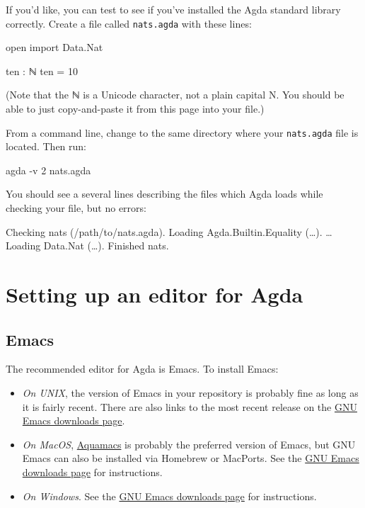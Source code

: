 If you'd like, you can test to see if you've installed the Agda standard
library correctly. Create a file called \texttt{nats.agda} with these
lines:

\begin{myDisplay}
open import Data.Nat

ten : ℕ
ten = 10
\end{myDisplay}

(Note that the ℕ is a Unicode character, not a plain capital N. You
should be able to just copy-and-paste it from this page into your file.)

From a command line, change to the same directory where your
\texttt{nats.agda} file is located. Then run:

\begin{myDisplay}
agda -v 2 nats.agda
\end{myDisplay}

You should see a several lines describing the files which Agda loads
while checking your file, but no errors:

\begin{myDisplay}
Checking nats (/path/to/nats.agda).
Loading  Agda.Builtin.Equality (…).
…
Loading  Data.Nat (…).
Finished nats.
\end{myDisplay}

\hypertarget{setting-up-an-editor-for-agda}{%
\section{Setting up an editor for
Agda}\label{setting-up-an-editor-for-agda}}

\hypertarget{emacs}{%
\subsection{Emacs}\label{emacs}}

The recommended editor for Agda is Emacs. To install Emacs:

\begin{itemize}
\item
  \emph{On UNIX}, the version of Emacs in your repository is probably
  fine as long as it is fairly recent. There are also links to the most
  recent release on the
  \href{https://www.gnu.org/software/emacs/download.html}{GNU Emacs
  downloads page}.
\item
  \emph{On MacOS}, \href{http://aquamacs.org/}{Aquamacs} is probably the
  preferred version of Emacs, but GNU Emacs can also be installed via
  Homebrew or MacPorts. See the
  \href{https://www.gnu.org/software/emacs/download.html}{GNU Emacs
  downloads page} for instructions.
\item
  \emph{On Windows}. See the
  \href{https://www.gnu.org/software/emacs/download.html}{GNU Emacs
  downloads page} for instructions.
\end{itemize}

